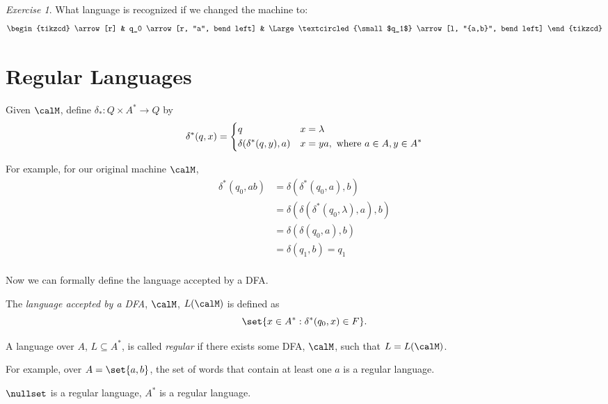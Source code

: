 \documentclass{article}
\theoremstyle{remark}
\newtheorem{exercise}{Exercise}
\begin{document}
\begin{example}
    \begin{exercise}
    What language is recognized if we changed the machine to:
    \[
        \begin{tikzcd}
 \arrow[r] & q_0 \arrow[r, "a", bend left] & \Large\textcircled{\small $q_1$} \arrow[l, "{a,b}", bend left]
\end{tikzcd}
        \]
    \end{exercise}

\end{example}


\section{Regular Languages}

\begin{definition}
    Given $\calM$, define $\delta_* : Q\times A^* \to Q$ by
    \[
        \delta^*(q,x)
        =\begin{dcases}
            q & x =\lambda \\
            \delta(\delta^*(q,y), a) & x = ya,\text{ where $a\in A, y\in A^*$}
        \end{dcases}
        \]
    
    For example, for our original machine $\calM$,
    \begin{align*}
        \delta^*(q_0,ab) &= \delta(\delta^*(q_0,a),b) \\
        &= \delta(\delta(\delta^*(q_0,\lambda),a),b) \\
        &= \delta(\delta(q_0,a),b) \\
        &= \delta(q_1,b) = q_1 \\
    \end{align*}
\end{definition}

Now we can formally define the language accepted by a DFA.
\begin{definition}
    The \emph{language accepted by a DFA}, $\calM$, $L(\calM)$ is defined
    as \[ \set{x\in A^* : \delta^*(q_0,x) \in F}.\]
\end{definition}

\begin{definition}
    A language over $A$, $L\subseteq A^*$, is called 
    \emph{regular} if there exists some DFA, $\calM$, such that
    $L=L(\calM)$.

    For example, over $A=\set{a,b}$, the set of words that
    contain at least one $a$ is a regular language.

    $\nullset$ is a regular language, $A^*$ is a regular language.
\end{definition}
\end{document}

